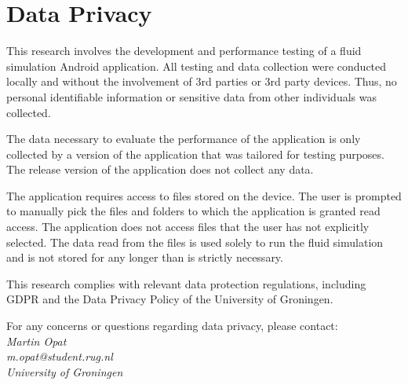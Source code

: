 \section*{Data Privacy} \label{section: data_privacy}

This research involves the development and performance testing of a fluid simulation Android application. All testing and data collection were conducted locally and without the involvement of 3rd parties or 3rd party devices. Thus, no personal identifiable information or sensitive data from other individuals was collected. \paraend

The data necessary to evaluate the performance of the application is only collected by a version of the application that was tailored for testing purposes. The release version of the application does not collect any data. \paraend

The application requires access to files stored on the device. The user is prompted to manually pick the files and folders to which the application is granted read access. The application does not access files that the user has not explicitly selected. The data read from the files is used solely to run the fluid simulation and is not stored for any longer than is strictly necessary. \paraend

This research complies with relevant data protection regulations, including GDPR and the Data Privacy Policy of the University of Groningen. \paraend

For any concerns or questions regarding data privacy, please contact: \\
\emph{    
    Martin Opat \\
    m.opat@student.rug.nl \\
    University of Groningen
}